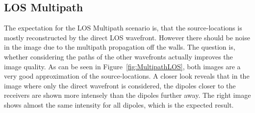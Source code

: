 \subsection{LOS Multipath}
The expectation for the LOS Multipath scenario is, that the source-locations is mostly reconstructed by the direct LOS wavefront.
However there should be noise in the image due to the multipath propagation off the walls.
The question is, whether considering the paths of the other wavefronts actually improves the image quality.
As can be seen in Figure~\ref{fig:MultipathLOS}, both images are a very good approximation of the source-locations.
A closer look reveals that in the image where only the direct wavefront is considered, the dipoles closer to the receivers are shown more intensely than the dipoles further away.
The right image shows almost the same intensity for all dipoles, which is the expected result.

